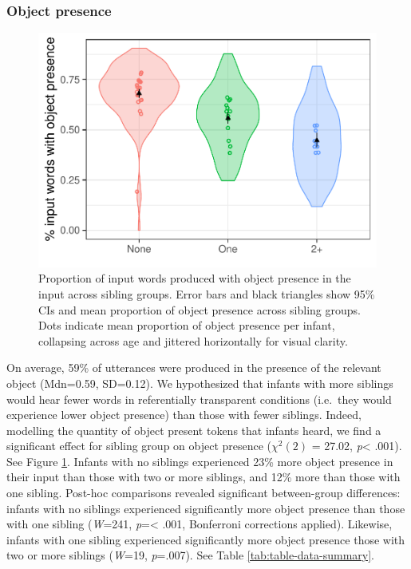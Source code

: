 \documentclass[
  english,
  man,floatsintext]{apa6}
\begin{document}
\hypertarget{object-presence}{%
\subsubsection{Object presence}\label{object-presence}}

\begin{figure}
\centering
\includegraphics{SiblingsStudyText_files/figure-latex/Figure-object-presence-1.pdf}
\caption{\label{fig:Figure-object-presence}Proportion of input words produced with object presence in the input across sibling groups. Error bars and black triangles show 95\% CIs and mean proportion of object presence across sibling groups. Dots indicate mean proportion of object presence per infant, collapsing across age and jittered horizontally for visual clarity.}
\end{figure}

On average, 59\% of utterances were produced in the presence of the relevant object (Mdn=0.59, SD=0.12). We hypothesized that infants with more siblings would hear fewer words in referentially transparent conditions (i.e.~they would experience lower object presence) than those with fewer siblings. Indeed, modelling the quantity of object present tokens that infants heard, we find a significant effect for sibling group on object presence (\(\chi^2 (2)\) = 27.02, \emph{p}\textless{} .001). See Figure \ref{fig:Figure-object-presence}. Infants with no siblings experienced 23\% more object presence in their input than those with two or more siblings, and 12\% more than those with one sibling. Post-hoc comparisons revealed significant between-group differences: infants with no siblings experienced significantly more object presence than those with one sibling (\emph{W}=241, \emph{p}=\textless{} .001, Bonferroni corrections applied). Likewise, infants with one sibling experienced significantly more object presence those with two or more siblings (\emph{W}=19, \emph{p}=.007). See Table \ref{tab:table-data-summary}.
\end{document}
